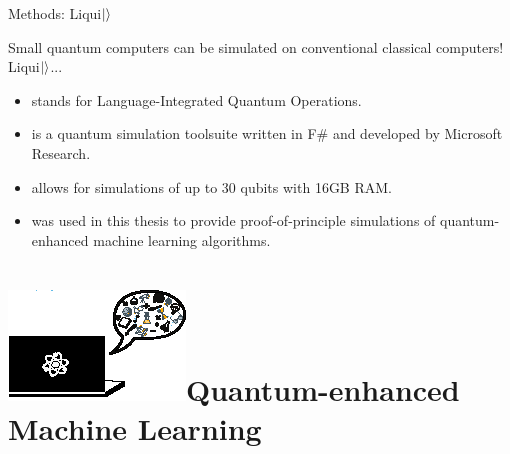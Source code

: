 \documentclass[10pt]{beamer}
\begin{document}
{
\begin{frame}[fragile]{Methods: Liqui$\ket{}$}

Small quantum computers can be simulated on conventional classical computers!\\
\vspace{0.5cm}
Liqui$\ket{}$...
\begin{itemize}
\item stands for Language-Integrated Quantum Operations. 
\item is a quantum simulation toolsuite written in F\# and developed by Microsoft Research.
\item allows for simulations of up to 30 qubits with 16GB RAM.
\item was used in this thesis to provide proof-of-principle simulations of quantum-enhanced machine learning algorithms.

\end{itemize}

\end{frame}
}

\section*{\protect\includegraphics[scale=2.4]{Vectors/laptop_qml.eps}\newline Quantum-enhanced Machine Learning}
\end{document}

